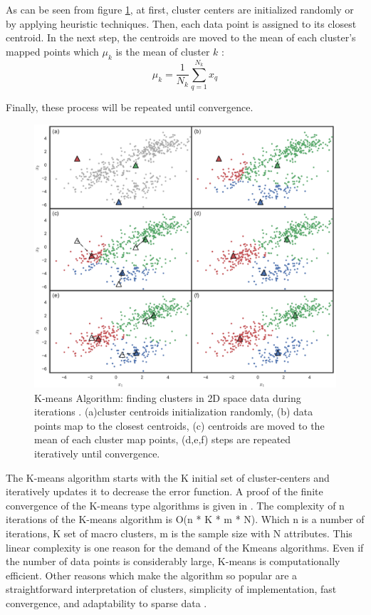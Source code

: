 \documentclass[../UNBThesis2.tex]{subfiles}
\begin{document}
As can be seen from figure \ref{ite}, at first, cluster centers are initialized randomly or by applying heuristic techniques. Then, each data point is assigned to its closest centroid. 
In the next step,  the centroids are moved to the mean of each cluster's mapped points which ${\mu_k}$ is the mean of cluster $k$ :
\begin{equation}
    {\mu_k} = \frac{1}{{N_k}}\sum_{q=1}^{{N_k}} {x_q}
\end{equation}

Finally, these process will be repeated until convergence. 

\begin{figure}
\centering
\includegraphics[width = 10 cm]{image/Chapters/Chapter2/kmeanshif.png}
\caption{K-means Algorithm: finding clusters in 2D space data during iterations \protect\cite{benavente2017automatic}. (a)cluster centroids initialization randomly, (b) data points map to the closest centroids, (c) centroids are moved to the mean of each cluster map points, (d,e,f) steps are repeated iteratively until convergence.}
\label{ite}
\end{figure}

The K-means algorithm starts with the K initial set of cluster-centers and iteratively updates it to decrease the error function. A proof of the finite convergence of the K-means type algorithms is given in \cite{selim1984k}. The complexity of n iterations of the K-means algorithm is O(n * K * m * N). Which n is a number of iterations, K set of macro clusters, m is the sample size with N attributes.  This linear complexity is one reason for the demand of the Kmeans algorithms. Even if the number of data points is considerably large, K-means is computationally efficient. 
Other reasons which make the algorithm so popular are a straightforward interpretation of clusters, simplicity of implementation, fast convergence, and adaptability to sparse data \cite{dhillon2001concept}.
\end{document}
